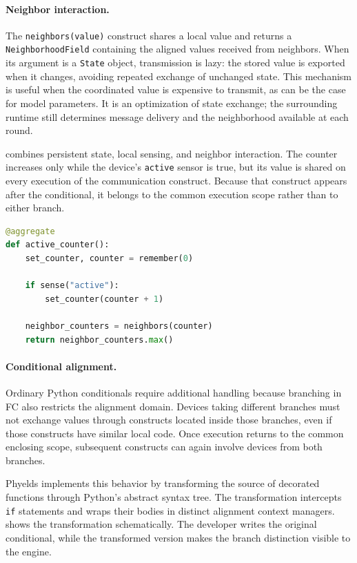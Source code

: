 \paragraph{Neighbor interaction.}
The \texttt{neighbors(value)} construct shares a local value and returns a
 \texttt{NeighborhoodField} containing the aligned values received from neighbors.
%
When its argument is a \texttt{State} object, transmission is lazy:
 the stored value is exported when it changes, avoiding repeated exchange
 of unchanged state.
%
This mechanism is useful when the coordinated value is expensive to transmit,
 as can be the case for model parameters.
%
It is an optimization of state exchange; the surrounding runtime still
 determines message delivery and the neighborhood available at each round.

 combines persistent state, local sensing, and neighbor
 interaction.
%
The counter increases only while the device's \texttt{active} sensor is true,
 but its value is shared on every execution of the communication construct.
%
Because that construct appears after the conditional, it belongs to the
 common execution scope rather than to either branch.

\begin{lstlisting}[language=Python,breaklines=true,
  caption={State, sensing, and neighbor interaction in Phyelds.},
  label={lst:phyelds-api}]
@aggregate
def active_counter():
    set_counter, counter = remember(0)

    if sense("active"):
        set_counter(counter + 1)

    neighbor_counters = neighbors(counter)
    return neighbor_counters.max()
\end{lstlisting}

\paragraph{Conditional alignment.}
Ordinary Python conditionals require additional handling because branching
 in \gls{FC} also restricts the alignment domain.
%
Devices taking different branches must not exchange values through
 constructs located inside those branches, even if those constructs have
 similar local code.
%
Once execution returns to the common enclosing scope, subsequent constructs
 can again involve devices from both branches.

Phyelds implements this behavior by transforming the source of decorated
 functions through Python's abstract syntax tree.
%
The transformation intercepts \texttt{if} statements and wraps their bodies
 in distinct alignment context managers.
%
 shows the transformation schematically.
%
The developer writes the original conditional, while the transformed
 version makes the branch distinction visible to the engine.

